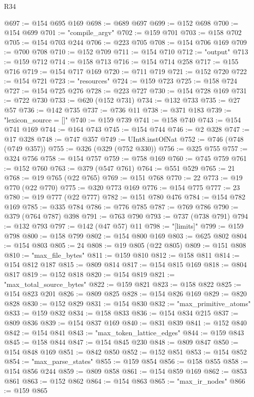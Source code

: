 \begin{lexlean}{R34}
\begin{coremodule}
@697 := @154 @695 @169
@698 := @689 @697
@699 := @152 @698
@700 := @154 @699
@701 := "compile_argv"
@702 := @159 @701
@703 := @158 @702
@705 := @154 @703 @244
@706 := @223 @705
@708 := @154 @706 @169
@709 := @700 @708
@710 := @152 @709
@711 := @154 @710
@712 := "output"
@713 := @159 @712
@714 := @158 @713
@716 := @154 @714 @258
@717 := @155 @716
@719 := @154 @717 @169
@720 := @711 @719
@721 := @152 @720
@722 := @154 @721
@723 := "resources"
@724 := @159 @723
@725 := @158 @724
@727 := @154 @725 @276
@728 := @223 @727
@730 := @154 @728 @169
@731 := @722 @730
@733 := @620 (@152 @731)
@734 := @132 @733
@735 := @27 @57
@736 := @142 @735
@737 := @736 @11
@738 := @371 @183
@739 := "lexicon_source = []"
@740 := @159 @739
@741 := @158 @740
@743 := @154 @741 @169
@744 := @164 @743
@745 := @154 @744
@746 := @2 @328
@747 := @17 @328
@748 := @747 @357
@749 := UInt8.instOfNat
@752 := @746 (@748 (@749 @357))
@755 := @326 (@329 (@752 @330))
@756 := @325 @755
@757 := @324 @756
@758 := @154 @757
@759 := @758 @169
@760 := @745 @759
@761 := @152 @760
@763 := @379 (@547 @761)
@764 := @551 @529
@765 := 21
@768 := @19 @765 (@22 @765)
@769 := @151 @768
@770 := 22
@773 := @19 @770 (@22 @770)
@775 := @320 @773 @169
@776 := @154 @775
@777 := 23
@780 := @19 @777 (@22 @777)
@782 := @151 @780 @476
@784 := @154 @782 @169
@785 := @335 @784
@786 := @776 @785
@787 := @769 @786
@790 := @379 (@764 @787) @398
@791 := @763 @790
@793 := @737 (@738 @791)
@794 := @132 @793
@797 := @142 (@47 @57) @11
@798 := "[limits]"
@799 := @159 @798
@800 := @158 @799
@802 := @154 @800 @169
@803 := @625 @802
@804 := @154 @803
@805 := 24
@808 := @19 @805 (@22 @805)
@809 := @151 @808
@810 := "max_file_bytes"
@811 := @159 @810
@812 := @158 @811
@814 := @154 @812 @187
@815 := @809 @814
@817 := @154 @815 @169
@818 := @804 @817
@819 := @152 @818
@820 := @154 @819
@821 := "max_total_source_bytes"
@822 := @159 @821
@823 := @158 @822
@825 := @154 @823 @201
@826 := @809 @825
@828 := @154 @826 @169
@829 := @820 @828
@830 := @152 @829
@831 := @154 @830
@832 := "max_primitive_atoms"
@833 := @159 @832
@834 := @158 @833
@836 := @154 @834 @215
@837 := @809 @836
@839 := @154 @837 @169
@840 := @831 @839
@841 := @152 @840
@842 := @154 @841
@843 := "max_token_lattice_edges"
@844 := @159 @843
@845 := @158 @844
@847 := @154 @845 @230
@848 := @809 @847
@850 := @154 @848 @169
@851 := @842 @850
@852 := @152 @851
@853 := @154 @852
@854 := "max_parse_states"
@855 := @159 @854
@856 := @158 @855
@858 := @154 @856 @244
@859 := @809 @858
@861 := @154 @859 @169
@862 := @853 @861
@863 := @152 @862
@864 := @154 @863
@865 := "max_ir_nodes"
@866 := @159 @865

\end{coremodule}
\end{lexlean}
